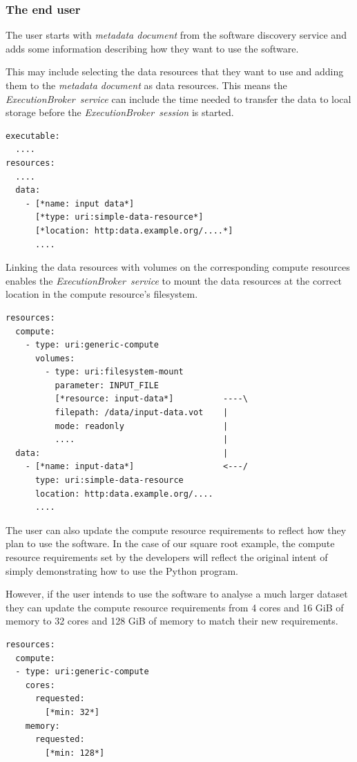 \documentclass[11pt,a4paper]{ivoa}
\newcommand{\execbrokerservice}[1] {\textit{ExecutionBroker~service#1}}
\newcommand{\execsession}[1] {\textit{ExecutionBroker~session#1}}
\newcommand{\metadoc} [1]{\textit{metadata document#1}}
\newcommand{\pythonprogram} {Python program}
\newcommand{\dataset}[1] {dataset#1}
\begin{document}
\subsubsection{The end user}
\label{subsub-software-user}

The user starts with \metadoc{} from the software discovery service and adds
some information describing how they want to use the software.

This may include selecting the data resources that they want to use
and adding them to the \metadoc{} as data resources.
This means the \execbrokerservice{}
can include the time needed to transfer the data to local storage before the
\execsession{} is started.

\begin{lstlisting}[]
executable:
  ....
resources:
  ....
  data:
    - [*name: input data*]
      [*type: uri:simple-data-resource*]
      [*location: http:data.example.org/....*]
      ....
\end{lstlisting}


Linking the data resources with volumes on the corresponding compute resources enables
the \execbrokerservice{} to mount the data resources at the correct location in
the compute resource's filesystem.

\begin{lstlisting}[]
resources:
  compute:
    - type: uri:generic-compute
      volumes:
        - type: uri:filesystem-mount
          parameter: INPUT_FILE
          [*resource: input-data*]          ----\
          filepath: /data/input-data.vot    |
          mode: readonly                    |
          ....                              |
  data:                                     |
    - [*name: input-data*]                  <---/
      type: uri:simple-data-resource
      location: http:data.example.org/....
      ....
\end{lstlisting}

The user can also update the compute resource requirements to reflect how they plan
to use the software.
In the case of our square root example, the compute resource requirements set by the
developers will reflect the original intent of simply demonstrating how to use the
\pythonprogram{}.

However, if the user intends to use the software to analyse a much larger \dataset{}
they can update the compute resource requirements from 4 cores and 16 GiB of memory
to 32 cores and 128 GiB of memory to match their new requirements.

\begin{lstlisting}[]
resources:
  compute:
  - type: uri:generic-compute
    cores:
      requested:
        [*min: 32*]
    memory:
      requested:
        [*min: 128*]
\end{lstlisting}
\end{document}
